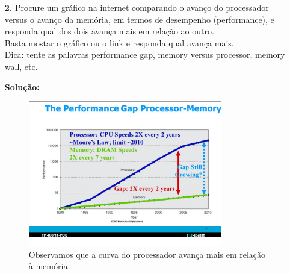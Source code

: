 \documentclass[12pt]{article}
\begin{document}
\begin{itemize}
  \newpage

  \item[{\bf 2.}] Procure um gráfico na internet comparando o avanço do processador 
  versus o avanço da memória, em termos de desempenho (performance), e responda qual dos dois avança mais em relação ao outro.
  \\
  Basta mostar o gráfico ou o link e responda qual avança mais.
  \\
  Dica: tente as palavras performance gap, memory versus processor, memory wall, etc.

  \vspace{0.5cm}
  \textbf{Solução:} \\  

  \begin{figure}[ht]
    \caption{Observamos que a curva do processador avança mais em relação à memória.}
    \centering
      \includegraphics[width=0.8\textwidth]{img/slide_7.jpg}
  \end{figure}
  \vspace{0.5cm}

\end{itemize}
\end{document}
